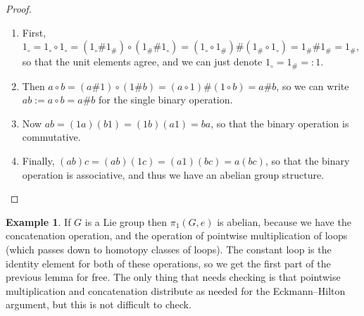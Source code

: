 \documentclass{tufte-handout}
\theoremstyle{definition}
\newtheorem{example}{Example}
\begin{document}
\begin{proof}
\begin{enumerate}
\item First, $1_\circ = 1_\circ \circ 1_\circ = (1_\circ \# 1_\#) \circ (1_\# \# 1_\circ) = 
(1_\circ \circ 1_\#) \# (1_\# \circ 1_\circ) = 1_\# \# 1_\# = 1_\#$, so that the unit elements agree, and we can just denote $1_\circ = 1_\# =: 1$.

\item Then $a\circ b = (a \# 1) \circ (1 \# b) = (a\circ 1) \# (1\circ b) = a \# b$, so we can write $ab := a\circ b = a \# b$ for the single binary operation.

\item Now $ab = (1a)(b1)=(1b)(a1)=ba$, so that the binary operation is commutative.

\item Finally, $(ab)c = (ab)(1c) = (a1)(bc)=a(bc)$, so that the binary operation is associative, and thus we have an abelian group structure. 
\end{enumerate}
\end{proof}

\begin{example}
If $G$ is a Lie group then $\pi_1(G,e)$ is abelian, because we have the concatenation operation, and the operation of pointwise multiplication of loops (which passes down to homotopy classes of loops). The constant loop is the identity element for both of these operations, so we get the first part of the previous lemma for free. The only thing that needs checking is that pointwise multiplication and concatenation distribute as needed for the Eckmann--Hilton argument, but this is not difficult to check.
\end{example}
\end{document}
